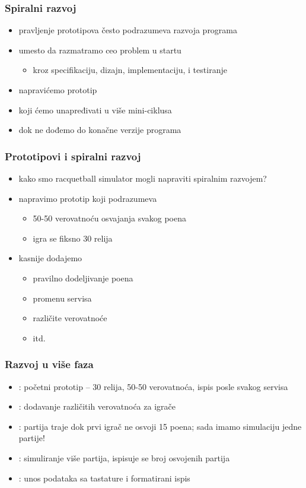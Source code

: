\documentclass[utf8,compress]{beamer}
\begin{document}
\begin{frame}
  \frametitle{Spiralni razvoj}
\begin{itemize}
  \item pravljenje prototipova često podrazumeva  razvoja programa
  \item umesto da razmatramo ceo problem u startu
  \begin{itemize}
    \item kroz specifikaciju, dizajn, implementaciju, i testiranje
  \end{itemize}
  \item napravićemo prototip
  \item koji ćemo unapređivati u više mini-ciklusa
  \item dok ne dođemo do konačne verzije programa
\end{itemize}
\end{frame}

\begin{frame}
  \frametitle{Prototipovi i spiralni razvoj}
\begin{itemize}
  \item kako smo racquetball simulator mogli napraviti spiralnim razvojem?
  \item napravimo prototip koji podrazumeva 
  \begin{itemize}
    \item 50-50 verovatnoću osvajanja svakog poena
    \item igra se fiksno 30 relija
  \end{itemize}
  \item kasnije dodajemo
  \begin{itemize}
    \item pravilno dodeljivanje poena
    \item promenu servisa
    \item različite verovatnoće
    \item itd.
  \end{itemize}
\end{itemize}
\end{frame}

\begin{frame}
  \frametitle{Razvoj u više faza}
\begin{itemize}
  \item {}: početni prototip -- 30 relija, 50-50 verovatnoća, ispis posle svakog servisa
  \item {}: dodavanje različitih verovatnoća za igrače
  \item {}: partija traje dok prvi igrač ne osvoji 15 poena; sada imamo simulaciju jedne partije!
  \item {}: simuliranje više partija, ispisuje se broj osvojenih partija
  \item {}: unos podataka sa tastature i formatirani ispis
\end{itemize}
\end{frame}
\end{document}
